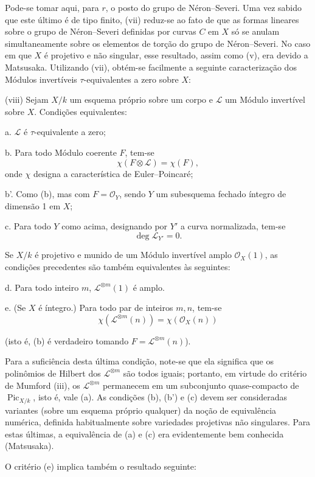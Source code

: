 \documentclass[11pt,twoside,openany]{book}
\numberwithin{equation}{section}
\newcommand{\src}[1]{%
  \phantomsection\hypertarget{src:#1}{}%
  \marginpar{\raggedleft\footnotesize\sffamily #1}%
}
\theoremstyle{plain}
\theoremstyle{definition}
\theoremstyle{remark}
\newcommand{\FgaUnitKey}{frontmatter}
\renewcommand{\src}[1]{%
  \phantomsection\hypertarget{src:\FgaUnitKey:#1}{}%
  \marginpar{\raggedleft\footnotesize\sffamily #1}%
}
\begin{document}
Pode-se tomar aqui, para $r$, o posto do grupo de Néron--Severi. Uma vez sabido
que este último é de tipo finito, (vii) reduz-se ao fato de que as formas
lineares sobre o grupo de Néron--Severi definidas por curvas $C$ em $X$ só se
anulam simultaneamente sobre os elementos de torção do grupo de Néron--Severi.
No caso em que $X$ é projetivo e não singular, esse resultado, assim como (v),
era devido a Matsusaka. Utilizando (vii), obtém-se facilmente a seguinte
caracterização dos Módulos invertíveis $\tau$-equivalentes a zero sobre $X$:

\medskip
\noindent(viii) Sejam $X/k$ um esquema próprio sobre um corpo e $\mathcal L$ um
Módulo invertível sobre $X$. Condições equivalentes:

\noindent a. $\mathcal L$ é $\tau$-equivalente a zero;

\noindent b. Para todo Módulo coerente $F$, tem-se
\[
\chi(F\otimes\mathcal L)=\chi(F),
\]
onde $\chi$ designa a característica de Euler--Poincaré;

\noindent b'. Como (b), mas com $F=\mathcal O_Y$, sendo $Y$ um subesquema
fechado íntegro de dimensão 1 em $X$;

\noindent c. Para todo $Y$ como acima, designando por $Y'$ a curva normalizada,
tem-se
\[
\deg\mathcal L_{Y'}=0.
\]

Se $X/k$ é projetivo e munido de um Módulo invertível amplo
$\mathcal O_X(1)$, as condições precedentes são também equivalentes às
seguintes:

\noindent d. Para todo inteiro $m$, $\mathcal L^{\otimes m}(1)$ é amplo.

\noindent e. (Se $X$ é íntegro.) Para todo par de inteiros $m,n$, tem-se
\[
\chi(\mathcal L^{\otimes m}(n))=\chi(\mathcal O_X(n))
\]
\src{306}
(isto é, (b) é verdadeiro tomando $F=\mathcal L^{\otimes m}(n)$).

Para a suficiência desta última condição, note-se que ela significa que os
polinômios de Hilbert dos $\mathcal L^{\otimes m}$ são todos iguais; portanto,
em virtude do critério de Mumford (iii), os $\mathcal L^{\otimes m}$ permanecem
em um subconjunto quase-compacto de $\operatorname{Pic}_{X/k}$, isto é, vale
(a). As condições (b), (b') e (c) devem ser consideradas variantes (sobre um
esquema próprio qualquer) da noção de equivalência numérica, definida
habitualmente sobre variedades projetivas não singulares. Para estas últimas,
a equivalência de (a) e (c) era evidentemente bem conhecida (Matsusaka).

O critério (e) implica também o resultado seguinte:
\end{document}
